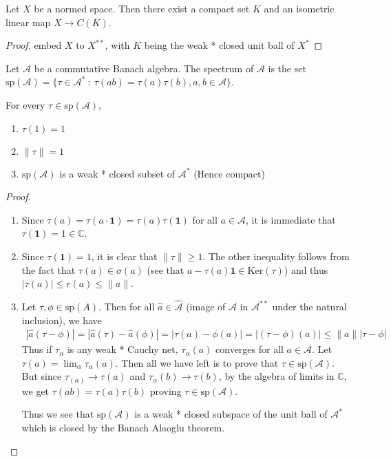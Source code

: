 \begin{lemma}
  Let $X$ be a normed space. Then there exist a compact set $K$ and
  an isometric linear map $X \to C(K)$.
\end{lemma}
\begin{proof}
  embed $X$ to $X^{**}$, with $K$ being the weak * closed unit ball of $X^*$
\end{proof}

\begin{definition}
  Let $\mathcal{A}$ be a commutative Banach algebra. The spectrum of
  $\mathcal{A}$ is the set $\textrm{sp}(\mathcal{A}) = \{ \tau \in
  \mathcal{A}^*  \ : \  \tau(ab) = \tau(a)\tau(b), a, b \in \mathcal{A} \}$.
\end{definition}

\begin{lemma}
  \label{lem:spectrum_is_compact}
  For every $\tau \in \textrm{sp}(\mathcal{A})$,
  \begin{enumerate}
    \item $\tau(1) = 1$
    \item $\|\tau\| = 1$
    \item $ \textrm{sp}(\mathcal{A})$ is a weak * closed subset of
      $\mathcal{A}^*$ (Hence compact)
  \end{enumerate}
\end{lemma}
\begin{proof}
  \begin{enumerate}[label=(\arabic*)]
    \item Since $\tau(a) = \tau(a \cdot \textbf{1}) =
      \tau(a)\tau(\textbf{1})$ for all $ a \in \mathcal{A}$, it is
      immediate that $\tau(\textbf{1}) = 1 \in \mathbb{C}$.
    \item Since $\tau(\textbf{1}) = 1$, it is clear that $\|\tau\|
      \ge 1$. The other inequality follows from the fact that
      $\tau(a) \in \sigma(a)$ (see that $a - \tau(a) \textbf{1} \in
      \textrm{Ker}(\tau)$) and thus $|\tau(a)| \le r(a) \le \|a\|$.
    \item Let $ \tau, \phi \in \textrm{sp}(A)$. Then for all $\hat{a}
      \in \hat{\mathcal{A}}$ (image of $\mathcal{A}$ in
      $\mathcal{A}^{**}$ under the natural inclusion), we have
      \begin{align*}
        |\hat{a}(\tau - \phi)| =  |\hat{a}(\tau) - \hat{a}(\phi)|
        = |\tau(a) - \phi(a)| =
        | (\tau - \phi)(a)| \le \|a\||\tau - \phi|
      \end{align*}
      Thus if $\tau_\alpha$ is any weak * Cauchy net, $\tau_\alpha(a)$
      converges for all $a \in \mathcal{A}$. Let $\tau(a) =
      \lim_{\alpha} \tau_\alpha(a)$. Then all we have left is to
      prove that $\tau \in \textrm{sp}(\mathcal{A})$. But since
      $\tau_(\alpha) \to \tau(a)$ and $\tau_\alpha(b) \to \tau(b)$,
      by the algebra of limits in $\mathbb{C}$, we get $ \tau(ab) =
      \tau(a) \tau(b)$ proving $\tau \in \textrm{sp}(\mathcal{A})$.

      Thus we see that $\textrm{sp}(\mathcal{A})$ is a weak * closed
      subspace of the unit ball of $\mathcal{A}^*$ which is closed by
      the Banach Alaoglu theorem.
  \end{enumerate}
\end{proof}
